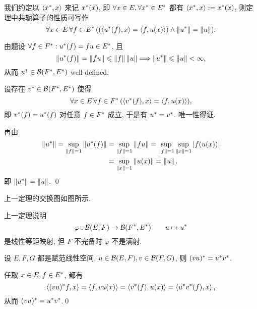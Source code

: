 	我们约定以 $ \left\langle x^{*}, x \right\rangle $ 来记 $ x^{*}(x) $, 即 $ \forall x\in E, \forall x^{*}\in E^{*} $ 都有 $ \left\langle x^{*}, x \right\rangle:=x^{*}(x) $, 则定理中共轭算子的性质可写作
	\[
		\forall x\in E\,\forall f\in E^{*}\,((\left\langle u^{*}(f), x \right\rangle=\left\langle f, u(x) \right\rangle)\land\left\| u^{*} \right\|=\left\| u \right\|).
	\]
	\begin{Proof}
		由题设 $ \forall f\in F^{*}: u^{*}(f)=fu\in E^{*} $, 且
		\[
			\left\| u^{*}(f) \right\|=\left\| fu \right\|\leqslant\left\| f \right\|\left\| u \right\|\Longrightarrow\left\| u^{*} \right\|\leqslant\left\| u \right\|<\infty,
		\]
		从而 $ u^{*}\in\mathcal{B}(F^{*}, E^{*}) $ well-defined.

		设存在 $ v^{*}\in\mathcal{B}(F^{*}, E^{*}) $ 使得
		\[
			\forall x\in E\,\forall f\in F^{*}\,(\left\langle v^{*}(f), x \right\rangle=\left\langle f, u(x) \right\rangle),
		\]
		即 $ v^{*}(f)=u^{*}(f) $ 对任意 $ f\in F^{*} $ 成立, 于是有 $ u^{*}=v^{*} $. 唯一性得证.

		再由
		\[
			\begin{aligned}
				\left\| u^{*} \right\|=\sup_{\left\| f \right\|=1}\left\| u^{*}(f) \right\| & = \sup_{\left\| f \right\|=1}\left\| fu \right\|=\sup_{\left\| f \right\|=1}\sup_{\left\| x \right\|=1}\left| f(u(x)) \right| \\
				& = \sup_{\left\| x \right\|=1}\left\| u(x) \right\|=\left\| u \right\|.
			\end{aligned}
		\]
		即 $ \left\| u^{*} \right\|=\left\| u \right\| $. \qed
	\end{Proof}
	
	上一定理的交换图如图所示.
		\begin{center}
		\end{center}
	\begin{Remark}
		上一定理说明
		\[
			\varphi:\mathcal{B}(E, F)\to \mathcal{B}(F^{*}, E^{*})\qquad u\mapsto u^{*}
		\]
		是线性等距映射, 但 $ F $ 不完备时 $ \varphi $ 不是满射.
	\end{Remark}

	\begin{Proposition}
		设 $ E, F, G $ 都是赋范线性空间, $ u\in\mathcal{B}(E, F), v\in\mathcal{B}(F, G) $, 则 $ (vu)^{*}=u^{*}v^{*} $.
	\end{Proposition}
	\begin{Proof}
		任取 $ x\in E, f\in E^{*} $, 都有
		\[
			\left\langle (vu)^{*}f, x \right\rangle=\left\langle f, vu(x) \right\rangle=\left\langle v^{*}(f), u(x) \right\rangle=\left\langle u^{*}v^{*}(f), x \right\rangle,
		\]
		从而 $ (vu)^{*}=u^{*}v^{*} $.\qed
	\end{Proof}

